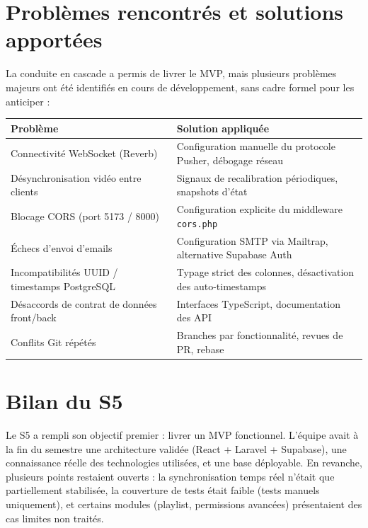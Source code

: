 \documentclass[11pt,a4paper]{report}
\begin{document}
\section{Problèmes rencontrés et solutions apportées}

La conduite en cascade a permis de livrer le MVP, mais plusieurs problèmes majeurs ont été identifiés en cours de développement, sans cadre formel pour les anticiper :

\begin{longtable}{L{0.38\textwidth} L{0.55\textwidth}}
\toprule
{}
\textbf{Problème} & \textbf{Solution appliquée} \\
\midrule
Connectivité WebSocket (Reverb) & Configuration manuelle du protocole Pusher, débogage réseau \\
Désynchronisation vidéo entre clients & Signaux de recalibration périodiques, snapshots d'état \\
Blocage CORS (port 5173 / 8000) & Configuration explicite du middleware \texttt{cors.php} \\
Échecs d'envoi d'emails & Configuration SMTP via Mailtrap, alternative Supabase Auth \\
Incompatibilités UUID / timestamps PostgreSQL & Typage strict des colonnes, désactivation des auto-timestamps \\
Désaccords de contrat de données front/back & Interfaces TypeScript, documentation des API \\
Conflits Git répétés & Branches par fonctionnalité, revues de PR, rebase \\
\bottomrule
\end{longtable}

\section{Bilan du S5}

Le S5 a rempli son objectif premier : livrer un MVP fonctionnel. L'équipe avait à la fin du semestre une architecture validée (React + Laravel + Supabase), une connaissance réelle des technologies utilisées, et une base déployable. En revanche, plusieurs points restaient ouverts : la synchronisation temps réel n'était que partiellement stabilisée, la couverture de tests était faible (tests manuels uniquement), et certains modules (playlist, permissions avancées) présentaient des cas limites non traités.

\end{document}
